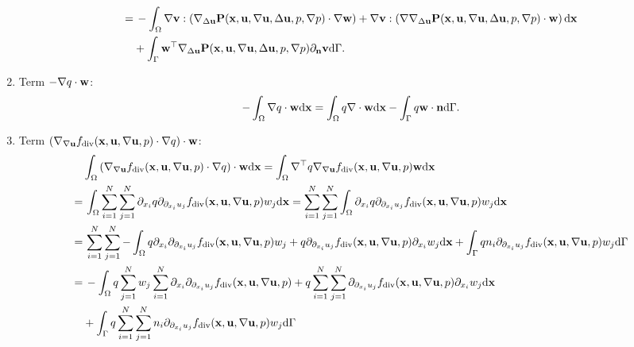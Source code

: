 \documentclass[oneside]{book}
\numberwithin{equation}{section}
\begin{document}
\begin{enumerate}[leftmargin=0in]
\begin{align*}
        =&\, -\int_\Omega \nabla{\bf v}:\left(\nabla_{\Delta{\bf u}}{\bf P}({\bf x},{\bf u},\nabla{\bf u},\Delta{\bf u},p,\nabla p)\cdot\nabla{\bf w}\right) + \nabla{\bf v}:\left(\nabla\nabla_{\Delta{\bf u}}{\bf P}({\bf x},{\bf u},\nabla{\bf u},\Delta{\bf u},p,\nabla p)\cdot{\bf w}\right){\rm d}{\bf x}\\
        &+ \int_\Gamma {\bf w}^\top\nabla_{\Delta{\bf u}}{\bf P}({\bf x},{\bf u},\nabla{\bf u},\Delta{\bf u},p,\nabla p)\partial_{\bf n}{\bf v}{\rm d}\Gamma.
    \end{align*}
    \item Term $-\nabla q\cdot{\bf w}$:
    \begin{align*}
        -\int_\Omega \nabla q\cdot{\bf w}{\rm d}{\bf x} = \int_\Omega q\nabla\cdot{\bf w}{\rm d}{\bf x} - \int_\Gamma q{\bf w}\cdot{\bf n}{\rm d}\Gamma.
    \end{align*}
    \item Term $\left(\nabla_{\nabla{\bf u}}f_{\rm div}({\bf x},{\bf u},\nabla{\bf u},p)\cdot\nabla q\right)\cdot{\bf w}$:
    \begin{align*}
        &\int_\Omega \left(\nabla_{\nabla{\bf u}}f_{\rm div}({\bf x},{\bf u},\nabla{\bf u},p)\cdot\nabla q\right)\cdot{\bf w}{\rm d}{\bf x} = \int_\Omega \nabla^\top q\nabla_{\nabla{\bf u}}f_{\rm div}({\bf x},{\bf u},\nabla{\bf u},p){\bf w}{\rm d}{\bf x}\\
        =&\, \int_\Omega \sum_{i=1}^N\sum_{j=1}^N \partial_{x_i}q\partial_{\partial_{x_i}u_j}f_{\rm div}({\bf x},{\bf u},\nabla{\bf u},p)w_j{\rm d}{\bf x} = \sum_{i=1}^N\sum_{j=1}^N \int_\Omega \partial_{x_i}q\partial_{\partial_{x_i}u_j}f_{\rm div}({\bf x},{\bf u},\nabla{\bf u},p)w_j{\rm d}{\bf x}\\
        =&\, \sum_{i=1}^N\sum_{j=1}^N -\int_\Omega q\partial_{x_i}\partial_{\partial_{x_i}u_j}f_{\rm div}({\bf x},{\bf u},\nabla{\bf u},p)w_j + q\partial_{\partial_{x_i}u_j}f_{\rm div}({\bf x},{\bf u},\nabla{\bf u},p)\partial_{x_i}w_j{\rm d}{\bf x} + \int_\Gamma qn_i\partial_{\partial_{x_i}u_j}f_{\rm div}({\bf x},{\bf u},\nabla{\bf u},p)w_j{\rm d}\Gamma\\
        =&\, -\int_\Omega q\sum_{j=1}^N w_j\sum_{i=1}^N \partial_{x_i}\partial_{\partial_{x_i}u_j}f_{\rm div}({\bf x},{\bf u},\nabla{\bf u},p) + q\sum_{i=1}^N\sum_{j=1}^N \partial_{\partial_{x_i}u_j}f_{\rm div}({\bf x},{\bf u},\nabla{\bf u},p)\partial_{x_i}w_j{\rm d}{\bf x}\\
        &+ \int_\Gamma q\sum_{i=1}^N\sum_{j=1}^N n_i\partial_{\partial_{x_i}u_j}f_{\rm div}({\bf x},{\bf u},\nabla{\bf u},p)w_j{\rm d}\Gamma\\

\end{align*}
\end{enumerate}
\end{document}

